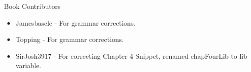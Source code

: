 \large Book Contributors \newline
\begin{itemize}
	\item Jamesbascle - For grammar corrections.
	\item Topping - For grammar corrections.
	\item SirJosh3917 - For correcting Chapter 4 Snippet, renamed chapFourLib to lib variable.
\end{itemize}

\newpage